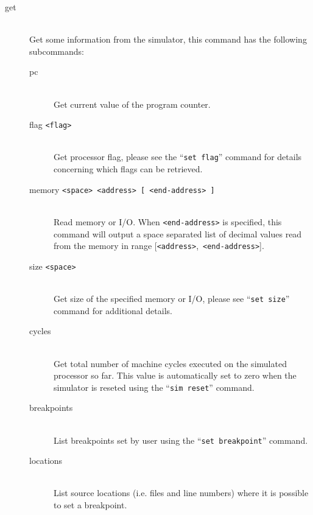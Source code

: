 \begin{description}
            \item[get]~\\
                Get some information from the simulator, this command has the following subcommands:
                \begin{description}
                    \item[pc]~\\
                        Get current value of the program counter.
                    \item[flag \texttt{<flag>}]~\\
                        Get processor flag, please see the ``\texttt{set~flag}'' command for details concerning which flags can be retrieved.
                    \item[memory \texttt{<space> <address> {[} <end-address> {]}}]~\\
                        Read memory or I/O. When \texttt{<end-address>} is specified, this command will output a space separated list of decimal values read from the memory in range {[}\texttt{<address>},~\texttt{<end-address>}{]}.
                    \item[size \texttt{<space>}]~\\
                        Get size of the specified memory or I/O, please see ``\texttt{set~size}'' command for additional details.
                    \item[cycles]~\\
                        Get total number of machine cycles executed on the simulated processor so far. This value is automatically set to zero when the simulator is reseted using the ``\texttt{sim~reset}'' command.
                    \item[breakpoints]~\\
                        List breakpoints set by user using the ``\texttt{set~breakpoint}'' command.
                    \item[locations]~\\
                        List source locations (i.e. files and line numbers) where it is possible to set a breakpoint.
                \end{description}


\end{description}
